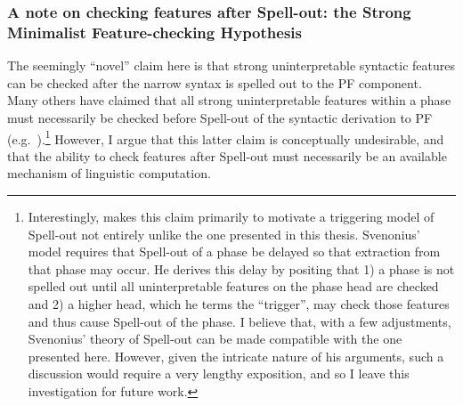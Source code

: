 \subsubsection{A note on checking features after Spell-out: the Strong Minimalist Feature-checking Hypothesis}
The seemingly ``novel'' claim here is that strong uninterpretable syntactic features can be checked after the narrow syntax is spelled out to the PF component. Many others have claimed that all strong uninterpretable features within a phase must necessarily be checked before Spell-out of the syntactic derivation to PF (e.g.\ ).\footnote{\label{sven_fn}Interestingly, \citet{svenonius2004} makes this claim primarily to motivate a triggering model of Spell-out not entirely unlike the one presented in this thesis. Svenonius' model requires that Spell-out of a phase be delayed so that extraction from that phase may occur. He derives this delay by positing that 1) a phase is not spelled out until all uninterpretable features on the phase head are checked and 2) a higher head, which he terms the ``trigger'', may check those features and thus cause Spell-out of the phase. I believe that, with a few adjustments, Svenonius' theory of Spell-out can be made compatible with the one presented here. However, given the intricate nature of his arguments, such a discussion would require a very lengthy exposition, and so I leave this investigation for future work.} However, I argue that this latter claim is conceptually undesirable, and that the ability to check features after Spell-out must necessarily be an available mechanism of linguistic computation.

